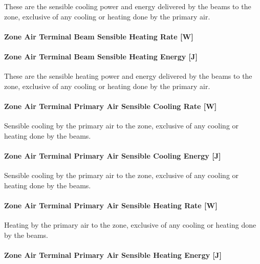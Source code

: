 These are the sensible cooling power and energy delivered by the beams to the zone, exclusive of any cooling or heating done by the primary air.

\paragraph{Zone Air Terminal Beam Sensible Heating Rate {[}W{]}}\label{zone-air-terminal-beam-sensible-heating-rate-w}

\paragraph{Zone Air Terminal Beam Sensible Heating Energy {[}J{]}}\label{zone-air-terminal-beam-sensible-heating-energy-j}

These are the sensible heating power and energy delivered by the beams to the zone, exclusive of any cooling or heating done by the primary air.

\paragraph{Zone Air Terminal Primary Air Sensible Cooling Rate {[}W{]}}\label{zone-air-terminal-primary-air-sensible-cooling-rate-w}

Sensible cooling by the primary air to the zone, exclusive of any cooling or heating done by the beams.

\paragraph{Zone Air Terminal Primary Air Sensible Cooling Energy {[}J{]}}\label{zone-air-terminal-primary-air-sensible-cooling-energy-j}

Sensible cooling by the primary air to the zone, exclusive of any cooling or heating done by the beams.

\paragraph{Zone Air Terminal Primary Air Sensible Heating Rate {[}W{]}}\label{zone-air-terminal-primary-air-sensible-heating-rate-w}

Heating by the primary air to the zone, exclusive of any cooling or heating done by the beams.

\paragraph{Zone Air Terminal Primary Air Sensible Heating Energy {[}J{]}}\label{zone-air-terminal-primary-air-sensible-heating-energy-j}

